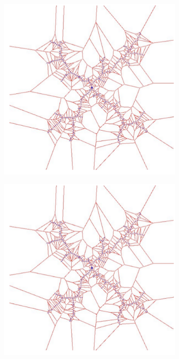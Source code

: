 \begin{figure}[h!]
\begin{subfigure}{.3\textwidth}
	\end{subfigure}
	\begin{subfigure}{.3\textwidth}
		\includegraphics[width=\textwidth]{figures/ch04_voron3.png}
	\end{subfigure}
	\begin{subfigure}{.3\textwidth}
		\includegraphics[width=\textwidth]{figures/ch04_voron3.png}

\end{subfigure}
\end{figure}
